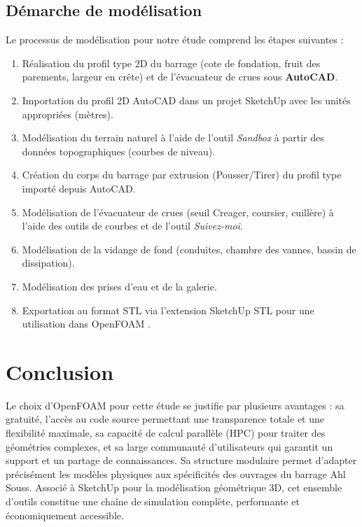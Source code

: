 \subsection{Démarche de modélisation}
\label{subsec:demarche_sketchup}

Le processus de modélisation pour notre étude comprend les étapes suivantes :
\begin{enumerate}
    \item Réalisation du profil type 2D du barrage (cote de fondation, fruit des parements, largeur en crête) et de l'évacuateur de crues sous \textbf{AutoCAD}.
    \item Importation du profil 2D AutoCAD dans un projet SketchUp avec les unités appropriées (mètres).
    \item Modélisation du terrain naturel à l'aide de l'outil \textit{Sandbox} à partir des données topographiques (courbes de niveau).
    \item Création du corps du barrage par extrusion (Pousser/Tirer) du profil type importé depuis AutoCAD.
    \item Modélisation de l'évacuateur de crues (seuil Creager, coursier, cuillère) à l'aide des outils de courbes et de l'outil \textit{Suivez-moi}.
    \item Modélisation de la vidange de fond (conduites, chambre des vannes, bassin de dissipation).
    \item Modélisation des prises d'eau et de la galerie.
    \item Exportation au format STL via l'extension SketchUp STL pour une utilisation dans OpenFOAM \cite{lhuillier2014sketchupstl}.
\end{enumerate}

\section{Conclusion}
\label{sec:conclusion_benchmark}

Le choix d'OpenFOAM pour cette étude se justifie par plusieurs avantages : sa gratuité, l'accès au code source permettant une transparence totale et une flexibilité maximale, sa capacité de calcul parallèle (HPC) pour traiter des géométries complexes, et sa large communauté d'utilisateurs qui garantit un support et un partage de connaissances. Sa structure modulaire permet d'adapter précisément les modèles physiques aux spécificités des ouvrages du barrage Ahl Souss. Associé à SketchUp pour la modélisation géométrique 3D, cet ensemble d'outils constitue une chaîne de simulation complète, performante et économiquement accessible.

